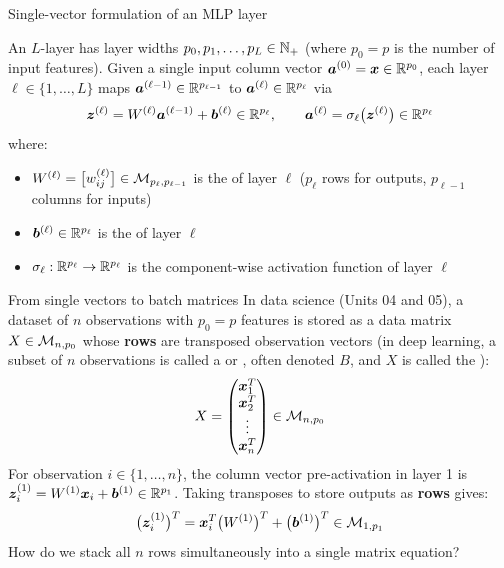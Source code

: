 \documentclass[aspectratio=169]{beamer}\usepackage[]{graphicx}\usepackage[]{xcolor}
\begin{document}
\begin{frame}{Single-vector formulation of an MLP layer}
\begin{importantdefinition}
\label{def:mlp-vector-layer}
An $L$-layer  has layer widths $p_0, p_1, \ldots, p_L \in \mathbb{N}_+$ (where $p_0 = p$ is the number of input features). Given a single input column vector $\bm{a}^{(0)} = \bm{x} \in \mathbb{R}^{p_0}$, each layer $\ell \in \{1, \ldots, L\}$ maps $\bm{a}^{(\ell-1)} \in \mathbb{R}^{p_{\ell-1}}$ to $\bm{a}^{(\ell)} \in \mathbb{R}^{p_\ell}$ via
\[
\bm{z}^{(\ell)} = W^{(\ell)} \bm{a}^{(\ell-1)} + \bm{b}^{(\ell)} \in \mathbb{R}^{p_\ell}, \qquad
\bm{a}^{(\ell)} = \sigma_\ell\big(\bm{z}^{(\ell)}\big) \in \mathbb{R}^{p_\ell}
\]
where:
\begin{itemize}
\item $W^{(\ell)} = \big[w_{ij}^{(\ell)}\big] \in \mathcal{M}_{p_\ell, p_{\ell-1}}$ is the  of layer $\ell$ ($p_\ell$ rows for outputs, $p_{\ell-1}$ columns for inputs)
\item $\bm{b}^{(\ell)} \in \mathbb{R}^{p_\ell}$ is the  of layer $\ell$
\item $\sigma_\ell: \mathbb{R}^{p_\ell} \to \mathbb{R}^{p_\ell}$ is the component-wise activation function of layer $\ell$
\end{itemize}
\end{importantdefinition}
\end{frame}


\begin{frame}{From single vectors to batch matrices}
In data science (Units 04 and 05), a dataset of $n$ observations with $p_0 = p$ features is stored as a data matrix $X \in \mathcal{M}_{n, p_0}$ whose \textbf{rows} are transposed observation vectors (in deep learning, a subset of $n$ observations is called a  or , often denoted $B$, and $X$ is called the ):
\[
X = \begin{pmatrix}
\bm{x}_1^T \\
\bm{x}_2^T \\
\vdots \\
\bm{x}_n^T
\end{pmatrix} \in \mathcal{M}_{n, p_0}
\]
\vfill
For observation $i \in \{1, \ldots, n\}$, the column vector pre-activation in layer 1 is $\bm{z}_i^{(1)} = W^{(1)} \bm{x}_i + \bm{b}^{(1)} \in \mathbb{R}^{p_1}$. Taking transposes to store outputs as \textbf{rows} gives:
\[
\big(\bm{z}_i^{(1)}\big)^T = \bm{x}_i^T \big(W^{(1)}\big)^T + \big(\bm{b}^{(1)}\big)^T \in \mathcal{M}_{1, p_1}
\]
\vfill
How do we stack all $n$ rows simultaneously into a single matrix equation?
\end{frame}
\end{document}
